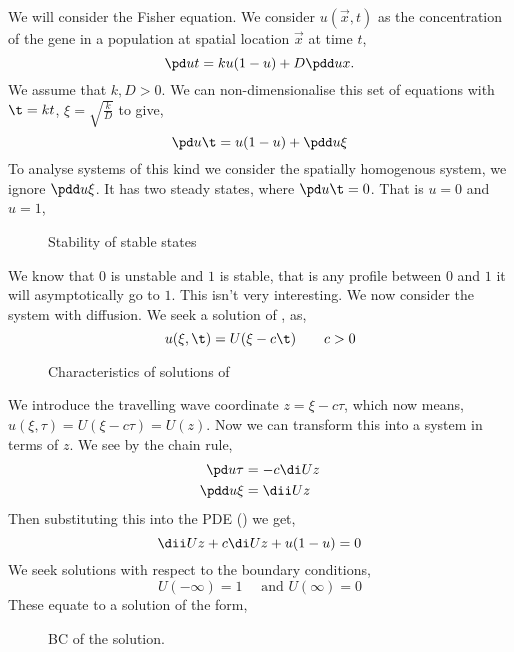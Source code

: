 We will consider the Fisher equation. We consider $u(\vec x, t)$ as the concentration of the gene in a population at spatial location $\vec x$ at time $t$,
$$ \pd u t = ku(1 - u) + D\pdd u x. $$
We assume that $k, D > 0$. We can non-dimensionalise this set of equations with $\t = kt$, $\xi = \sqrt{\frac{k}{D}}$ to give,
\begin{equation}
  \pd u \t = u(1 - u) + \pdd u \xi\label{equ:fisher}
\end{equation}
To analyse systems of this kind we consider the spatially homogenous system, we ignore $\pdd u \xi$. It has two steady states, where $\pd u \t = 0$. That is $u = 0$ and $u = 1$,\newpage

\begin{figure}[!ht]
\centering
\resizebox{0.4\textwidth}{!}{}
\caption{Stability of stable states}
\end{figure}

\noindent
We know that $0$ is unstable and $1$ is stable, that is any profile between $0$ and $1$ it will asymptotically go to $1$. This isn't very interesting. We now consider the system with diffusion. We seek a solution of , as,
$$ u(\xi, \t) = U(\xi - c\t) \qquad c > 0 $$

\begin{figure}[!ht]
\centering
\resizebox{0.6\textwidth}{!}{}
\caption{Characteristics of solutions of }
\end{figure}

\noindent
We introduce the travelling wave coordinate $z = \xi - c\tau$, which now means, $u(\xi, \tau) = U(\xi - c\tau) = U(z)$. Now we can transform this into a system in terms of $z$. We see by the chain rule,
\begin{align*}
  \pd u \tau &= -c \di U z\\
  \pdd u \xi &= \dii U z
\end{align*}
Then substituting this into the PDE () we get,
$$ \dii U z + c\di U z + u(1 - u) = 0 $$
We seek solutions with respect to the boundary conditions,
$$ U(-\infty) = 1 \quad \text{ and } U(\infty) = 0 $$
These equate to a solution of the form,\newpage

\begin{figure}[!ht]
\centering
\resizebox{0.6\textwidth}{!}{}
\caption{BC of the solution.}
\end{figure}

